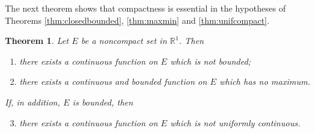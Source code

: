 \documentclass{article}
\theoremstyle{mythm}
\newtheorem{theorem}{Theorem}[section]
\begin{document}
The next theorem shows that compactness is essential in the hypotheses of Theorems \ref{thm:closedbounded}, \ref{thm:maxmin} and \ref{thm:unifcompact}.

\begin{theorem}\label{thm:noncompact}
Let $E$ be a noncompact set in $\mathbb{R}^1$. Then
\begin{enumerate}[label=(\alph*)]
    \item there exists a continuous function on $E$ which is not bounded;
    \item there exists a continuous and bounded function on $E$ which has no maximum.
\end{enumerate}
If, in addition, $E$ is bounded, then
\begin{enumerate}[label=(\alph*)]
    \setcounter{enumi}{2}
    \item there exists a continuous function on $E$ which is not uniformly continuous.
\end{enumerate}
\end{theorem}
\end{document}
